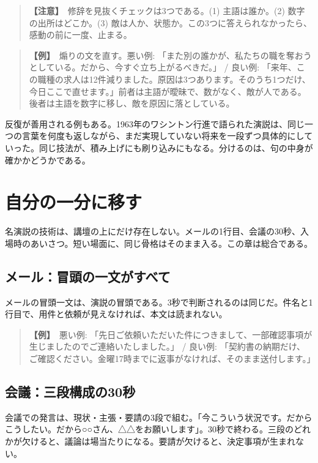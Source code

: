 \documentclass{article}
\begin{document}
\begin{quote}
\textbf{【注意】}\ 修辞を見抜くチェックは3つである。(1) 主語は誰か。(2) 数字の出所はどこか。(3) 敵は人か、状態か。この3つに答えられなかったら、感動の前に一度、止まる。
\end{quote}

\begin{quote}
\textbf{【例】}\ 煽りの文を直す。悪い例: 「また別の誰かが、私たちの職を奪おうとしている。だから、今すぐ立ち上がるべきだ。」 / 良い例: 「来年、この職種の求人は12件減りました。原因は3つあります。そのうち1つだけ、今日ここで直せます。」前者は主語が曖昧で、数がなく、敵が人である。後者は主語を数字に移し、敵を原因に落としている。
\end{quote}

反復が善用される例もある。1963年のワシントン行進で語られた演説は、同じ一つの言葉を何度も返しながら、まだ実現していない将来を一段ずつ具体的にしていった。同じ技法が、積み上げにも刷り込みにもなる。分けるのは、句の中身が確かかどうかである。

\section{自分の一分に移す}

名演説の技術は、講壇の上にだけ存在しない。メールの1行目、会議の30秒、入場時のあいさつ。短い場面に、同じ骨格はそのまま入る。この章は総合である。

\subsection{メール：冒頭の一文がすべて}

メールの冒頭一文は、演説の冒頭である。3秒で判断されるのは同じだ。件名と1行目で、用件と依頼が見えなければ、本文は読まれない。

\begin{quote}
\textbf{【例】}\ 悪い例: 「先日ご依頼いただいた件につきまして、一部確認事項が生じましたのでご連絡いたしました。」 / 良い例: 「契約書の納期だけ、ご確認ください。金曜17時までに返事がなければ、そのまま送付します。」
\end{quote}

\subsection{会議：三段構成の30秒}

会議での発言は、現状・主張・要請の3段で組む。「今こういう状況です。だからこうしたい。だから○○さん、△△をお願いします」。30秒で終わる。三段のどれかが欠けると、議論は場当たりになる。要請が欠けると、決定事項が生まれない。
\end{document}
